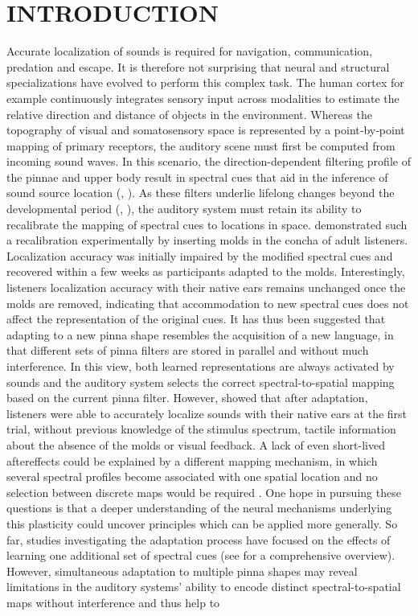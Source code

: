 \newpage\section{INTRODUCTION}\label{sec1}%

Accurate localization of sounds is required for navigation, communication, predation and escape. It is therefore not surprising that neural and structural specializations have evolved to perform this complex task. The human cortex for example continuously integrates sensory input across modalities to estimate the relative direction and distance of objects in the environment. Whereas the topography of visual and somatosensory space is represented by a point‐by‐point mapping of primary receptors, the auditory scene must first be computed from incoming sound waves. In this scenario, the direction-dependent filtering profile of the pinnae and upper body result in spectral cues that aid in the inference of sound source location (\citet{wightman_headphone_1989},  \citet{blauert_spatial_1996}). As these filters underlie lifelong changes beyond the developmental period (\citet{otte_age-related_2013}, \citet{clifton_growth_1988}), the auditory system must retain its ability to recalibrate the mapping of spectral cues to locations in space. \citet{hofman_relearning_1998} demonstrated such a recalibration experimentally by inserting molds in the concha of adult listeners. Localization accuracy was initially impaired by the modified spectral cues and recovered within a few weeks as participants adapted to the molds. Interestingly, listeners localization accuracy with their native ears remains unchanged once the molds are removed, indicating that accommodation to new spectral cues does not affect the representation of the original cues. It has thus been suggested that adapting to a new pinna shape resembles the acquisition of a new language, in that different sets of pinna filters are stored in parallel and without much interference. In this view, both learned representations are always activated by sounds and the auditory system selects the correct spectral-to-spatial mapping based on the current pinna filter. However, \citet{trapeau_fast_2016} showed that after adaptation, listeners were able to accurately localize sounds with their native ears at the first trial, without previous knowledge of the stimulus spectrum, tactile information about the absence of the molds or visual feedback. A lack of even short-lived aftereffects could be explained by a different mapping mechanism, in which several spectral profiles become associated with one spatial location and no selection between discrete maps would be required \citep{trapeau_fast_2016}. One hope in pursuing these questions is that a deeper understanding of the neural mechanisms underlying this plasticity could uncover principles which can be applied more generally. So far, studies investigating the adaptation process have focused on the effects of learning one additional set of spectral cues (see \citet{carlile_plastic_2014} for a comprehensive overview). However, simultaneous adaptation to multiple pinna shapes may reveal limitations in the auditory systems' ability to encode distinct spectral-to-spatial maps without interference and thus help to 